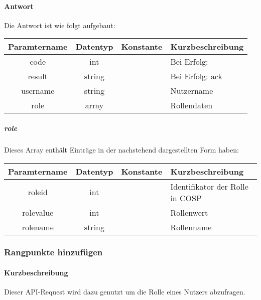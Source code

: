\paragraph{Antwort}Die Antwort ist wie folgt aufgebaut:
\begin{table}[H]
	\begin{tabular}{|c|c|c|p{6.5cm}|}
		\hline
		\textbf{Paramtername} & \textbf{Datentyp} & \textbf{Konstante} & \textbf{Kurzbeschreibung}            \\ \hline                
		code                & int              &                 & Bei Erfolg: {\glqq 0\grqq} \\ \hline
		result              & string           &                 & Bei Erfolg: {\glqq ack\grqq} \\ \hline
		username            & string           &                 & Nutzername \\ \hline
		role                & array            &                 & Rollendaten \\ \hline
	\end{tabular}
\end{table}
\subparagraph{role}Dieses Array enthält Einträge in der nachstehend dargestellten Form haben:
\begin{table}[H]
	\begin{tabular}{|c|c|c|p{6.5cm}|}
		\hline
		\textbf{Paramtername} & \textbf{Datentyp} & \textbf{Konstante} & \textbf{Kurzbeschreibung}    \\ \hline
		roleid             & int               &                 & Identifikator der Rolle in {\glqq COSP\grqq} \\ \hline
		rolevalue          & int               &                 & Rollenwert \\ \hline
		rolename           & string            &                 & Rollenname \\ \hline
	\end{tabular}
\end{table}
\subsubsection{Rangpunkte hinzufügen}
\paragraph{Kurzbeschreibung}Dieser API-Request wird dazu genutzt um die Rolle eines Nutzers abzufragen.
